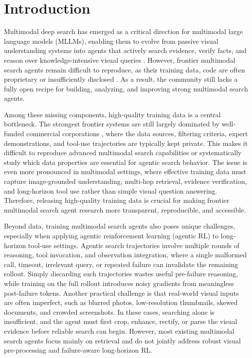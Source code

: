 \section{Introduction}
\label{sec:introduction}


Multimodal deep search has emerged as a critical direction for multimodal large language models (MLLMs), enabling them to evolve from passive visual understanding systems into agents that actively search evidence, verify facts, and reason over knowledge-intensive visual queries \citep{huang2026vision,feng2026gen,chen2026unify}.
However, frontier multimodal search agents remain difficult to reproduce, as their training data, code are often proprietary or insufficiently disclosed \citep{seed2.0,huang2026vision,singh2025openai, kimiteam2026kimik25visualagentic}. As a result, the community still lacks a fully open recipe for building, analyzing, and improving strong multimodal search agents.

Among these missing components, high-quality training data is a central bottleneck. The strongest frontier systems are still largely dominated by well-funded commercial corporations \citep{Claude_4,comanici2025gemini}, where the data sources, filtering criteria, expert demonstrations, and tool-use trajectories are typically kept private. 
This makes it difficult to reproduce advanced multimodal search capabilities or systematically study which data properties are essential for agentic search behavior.
The issue is even more pronounced in multimodal settings, where effective training data must capture image-grounded understanding, multi-hop retrieval, evidence verification, and long-horizon tool use rather than simple visual question answering. 
Therefore, releasing high-quality training data is crucial for making frontier multimodal search agent research more transparent, reproducible, and accessible.

Beyond data, training multimodal search agents also poses unique challenges, especially when applying agentic reinforcement learning (agentic RL) \citep{fan2026exploring,webwatcher,huang2026vision} to long-horizon tool-use settings. 
Agentic search trajectories involve multiple rounds of reasoning, tool invocation, and observation integration, where a single malformed call, timeout, irrelevant query, or repeated failure can invalidate the remaining rollout. 
Simply discarding such trajectories wastes useful pre-failure reasoning, while training on the full rollout introduces noisy gradients from meaningless post-failure tokens. 
Another practical challenge is that real-world visual inputs are often imperfect, such as blurred photos, low-resolution thumbnails, skewed documents, and crowded screenshots. 
In these cases, searching alone is insufficient, and the agent must first crop, enhance, rectify, or parse the visual evidence before reliable search can begin. 
However, most existing multimodal search agents focus mainly on retrieval and do not jointly address robust visual pre-processing and failure-aware long-horizon RL.

